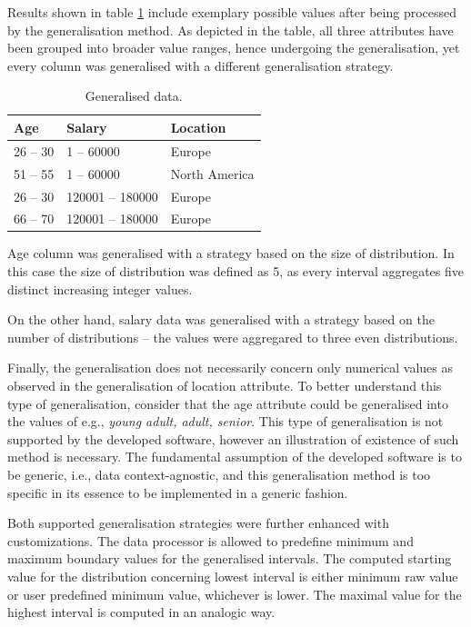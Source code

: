 \documentclass[a4paper,twoside,12pt]{book}
\begin{document}
Results shown in table \ref{id:tab:generalisation} include exemplary possible values after being processed by the generalisation method. As depicted in the table, all three attributes have been grouped into broader value ranges, hence undergoing the generalisation, yet every column was generalised with a different generalisation strategy.


\begin{table}[h]
\centering
\caption{Generalised data.}
\label{id:tab:generalisation}
\begin{tabular}{lll}
\toprule
Age   & Salary          & Location      \\ \hline
26 – 30 & 1 – 60000       & Europe        \\
51 – 55 & 1 – 60000       & North America \\
26 – 30 & 120001 – 180000 & Europe        \\
66 – 70 & 120001 – 180000 & Europe        \\ \hline
\end{tabular}
\end{table}

Age column was generalised with a strategy based on the size of distribution. In this case the size of distribution was defined as 5, as every interval aggregates five distinct increasing integer values.

On the other hand, salary data was generalised with a strategy based on the number of distributions – the values were aggregared to three even distributions.

Finally, the generalisation does not necessarily concern only numerical values as observed in the generalisation of location attribute. To better understand this type of generalisation, consider that the age attribute could be generalised into the values of e.g., \textit{young adult, adult, senior}. This type of generalisation is not supported by the developed software, however an illustration of existence of such method is necessary. The fundamental assumption of the developed software is to be generic, i.e., data context-agnostic, and this generalisation method is too specific in its essence to be implemented in a generic fashion.

Both supported generalisation strategies were further enhanced with customizations. The data processor is allowed to predefine minimum and maximum boundary values for the generalised intervals. The computed starting value for the distribution concerning lowest interval is either minimum raw value or user predefined minimum value, whichever is lower. The maximal value for the highest interval is computed in an analogic way.
\end{document}
